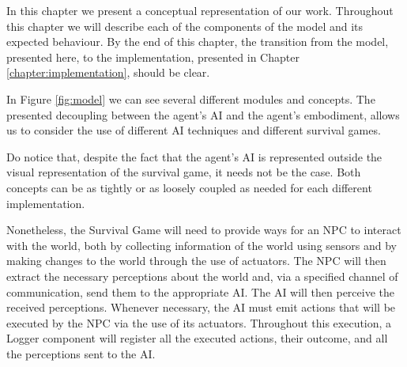 \cleardoublepage
\label{chapter:conceptual-model}


\noindent In this chapter we present a conceptual representation of our work.
Throughout this chapter we will describe each of the components of the model and its expected behaviour.
By the end of this chapter, the transition from the model, presented here, to the implementation, presented in Chapter \ref{chapter:implementation}, should be clear. 

In Figure \ref{fig:model} we can see several different modules and concepts.
The presented decoupling between the agent's \ac{AI} and the agent's embodiment, allows us to consider the use of different \ac{AI} techniques and different survival games.

Do notice that, despite the fact that the agent's \ac{AI} is represented outside the visual representation of the survival game, it needs not be the case.
Both concepts can be as tightly or as loosely coupled as needed for each different implementation.

Nonetheless, the Survival Game will need to provide ways for an \ac{NPC} to interact with the world, both by collecting information of the world using sensors and by making changes to the world through the use of actuators.
The \ac{NPC} will then extract the necessary perceptions about the world and, via a specified channel of communication, send them to the appropriate \ac{AI}.
The \ac{AI} will then perceive the received perceptions.
Whenever necessary, the \ac{AI} must emit actions that will be executed by the \ac{NPC} via the use of its actuators.
Throughout this execution, a Logger component will register all the executed actions, their outcome, and all the perceptions sent to the \ac{AI}.

